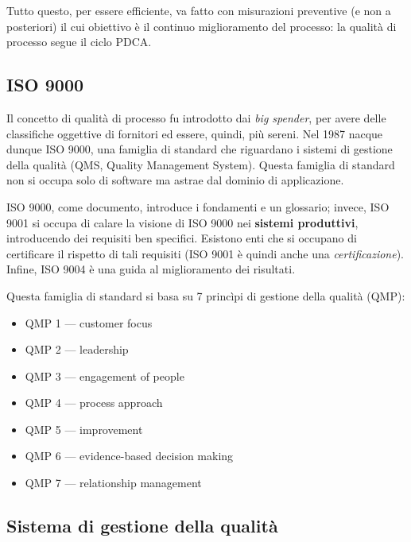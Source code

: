 \documentclass[a4paper]{article}
\begin{document}
Tutto questo, per essere efficiente, va fatto con misurazioni preventive (e non a posteriori) il cui obiettivo è il continuo miglioramento del processo: la qualità di processo segue il ciclo PDCA.

		
	\subsection{ISO 9000}

		
Il concetto di qualità di processo fu introdotto dai \emph{big spender}, per avere delle classifiche oggettive di fornitori ed essere, quindi, più sereni. Nel 1987 nacque dunque ISO 9000, una famiglia di standard che riguardano i sistemi di gestione della qualità (QMS, Quality Management System). Questa famiglia di standard non si occupa solo di software ma astrae dal dominio di applicazione.
		
ISO 9000, come documento, introduce i fondamenti e un glossario; invece, ISO 9001 si occupa di calare la visione di ISO 9000 nei \textbf{sistemi produttivi}, introducendo dei requisiti ben specifici. Esistono enti che si occupano di certificare il rispetto di tali requisiti (ISO 9001 è quindi anche una \emph{certificazione}). Infine, ISO 9004 è una guida al miglioramento dei risultati.
		
Questa famiglia di standard si basa su 7 princìpi di gestione della qualità (QMP):
		
	\begin{itemize}
		
			
	\item QMP 1 — customer focus
			
	\item QMP 2 — leadership
			
	\item QMP 3 — engagement of people
			
	\item QMP 4 — process approach
			
	\item QMP 5 — improvement
			
	\item QMP 6 — evidence-based decision making
			
	\item QMP 7 — relationship management
		
	\end{itemize}


		
	\subsection{Sistema di gestione della qualità}
\end{document}
